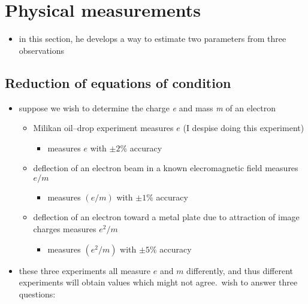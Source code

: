 \documentclass[../jaynes_prob_theory_notes.tex]{subfiles}
\begin{document}
    \section{Physical measurements}
        \begin{itemize} 
            \item in this section, he develops a way to estimate two parameters from three observations
        \end{itemize}

        \subsection{Reduction of equations of condition}
            \begin{itemize} 
                \item suppose we wish to determine the charge \textit{e} and mass \textit{m} of an electron
                    \begin{itemize} 
                        \item Milikan oil--drop experiment measures \(e\) (I despise doing this experiment)
                            \begin{itemize} 
                                \item measures \(e\) with \(\pm 2\%\) accuracy
                            \end{itemize}
                        \item deflection of an electron beam in a known elecromagnetic field measures \(e/m\)
                            \begin{itemize} 
                                \item measures \((e/m)\) with \(\pm 1\%\) accuracy
                            \end{itemize}
                        \item deflection of an electron toward a metal plate due to attraction of image charges measures \(e^2/m\)
                            \begin{itemize} 
                                \item measures \((e^2/m)\) with \(\pm 5\%\) accuracy
                            \end{itemize}
                    \end{itemize}
                \item these three experiments all measure \(e\) and \(m\) differently, and thus different experiments will obtain values which might not agree.\ wish to answer three questions:

\end{itemize}
\end{document}
